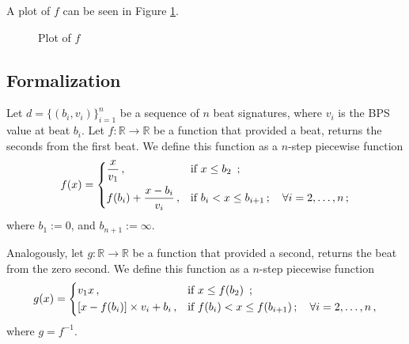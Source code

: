 \documentclass[a4paper,9pt]{article}
\begin{document}
    A plot of $f$ can be seen in Figure \ref{fig:second2beat}.
\begin{figure}[htpb]
	\centering

	\caption{Plot of $f$}
	\label{fig:second2beat}
\end{figure}

\subsection{Formalization}
Let $d = \{\left( b_i, v_i \right)\}_{i=1}^{n}$ be a sequence of $n$ beat signatures, where $v_i$ is the BPS  value at beat $b_i$. 
Let $ f: \mathbb{R} \rightarrow \mathbb{R} $ be a function that provided a beat, returns the seconds from the first beat. We define this function as a $n$-step piecewise function
    \begin{equation}
	    f(x) = \begin{dcases}
		    \frac{x}{v_1}\,, & \text{if $x \leq b_{2} $ }\,;\\
		    f(b_{i}) + \frac{x-b_{i}}{v_i}\,, & \text{if $b_{i} < x \leq b_{i+1}\,; \quad \forall i=2,\ldots,n $}\,; \\
	    \end{dcases}
	    \label{eq:beat2second}
    \end{equation}
    where $ b_1 := 0$,  and $b_{n+1} := \infty$.
    
    Analogously, let $ g: \mathbb{R} \rightarrow \mathbb{R} $ be a function that provided a second, returns the beat from the zero second. We define this function as a $n$-step piecewise function
    \begin{equation}
	    g(x) = \begin{dcases}
		    v_1x\,, & \text{if $x \leq f(b_{2}) $ }\,;\\
		    \left[x-f(b_{i})\right]\times v_i + b_{i}\,, & \text{if $f(b_{i}) < x \leq f(b_{i+1})\,;\quad \forall i=2,\ldots,n$}\,, \\
	    \end{dcases}
	    \label{eq:beat2second}
    \end{equation}
    where $g = f^{-1}$.
\end{document}
